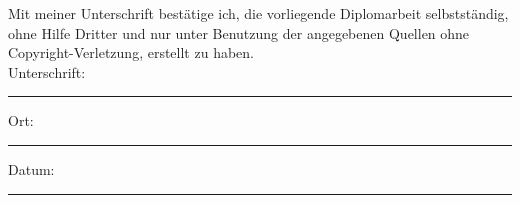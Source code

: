 \documentclass[
  11pt, %
  oneside, %
  ngerman, %
  singlespacing, %
  liststotoc, %
  headsepline, %
]{MastersDoctoralThesis} %
\begin{document}

\begin{declaration}
  \addchaptertocentry{\authorshipname} %
  \noindent Mit meiner Unterschrift bestätige ich, die vorliegende Diplomarbeit
  selbstständig, ohne Hilfe Dritter und nur unter Benutzung der angegebenen
  Quellen ohne Copyright-Verletzung, erstellt zu haben.\\

  \noindent Unterschrift:\\
  \rule[0.5em]{25em}{0.5pt}

  \noindent Ort:\\
  \rule[0.5em]{25em}{0.5pt}

  \noindent Datum:\\
  \rule[0.5em]{25em}{0.5pt}
\end{declaration}

\cleardoublepage

\end{document}

